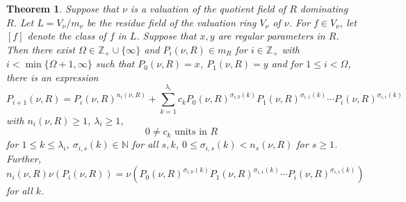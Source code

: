 \documentclass[11pt]{amsart}
\def\NZQ{\mathbb}               %
\def\NN{{\NZQ N}}
\def\ZZ{{\NZQ Z}}
\newtheorem{Theorem}{Theorem}[section]
\begin{document}
\begin{Theorem}\label{Theorem1*} Suppose that  $\nu$ is a  valuation 
of the quotient field of $R$ dominating $R$. Let $L=V_{\nu}/m_{\nu}$ be the residue field of the valuation ring $V_{\nu}$ of $\nu$. For $f \in V_{\nu}$, let $[f]$ denote the class of $f$ in $L$. Suppose that $x,y$ are regular parameters in $R$.
Then  there exist $\Omega\in\ZZ_+\cup\{\infty\}$ and 
$P_i(\nu,R)\in m_R$ for $i\in\ZZ_+$ with $i<\min\{\Omega+1,\infty\}$
 such that $P_0(\nu,R)=x$, $P_1(\nu,R)=y$ and for $1\le i<\Omega$, there is an expression
 \begin{equation}\label{eq11*} 
 P_{i+1}(\nu,R) = P_i(\nu,R)^{n_i(\nu,R)}+\sum_{k=1}^{\lambda_i} c_kP_0(\nu,R)^{\sigma_{i,0}(k)}P_1(\nu,R)^{\sigma_{i,1}(k)}\cdots P_{i}(\nu,R)^{\sigma_{i,i}(k)}
 \end{equation}
 with $n_i(\nu,R)\ge 1$, $\lambda_i\ge 1$, 
 \begin{equation}\label{eq12*}
 0\ne c_k\mbox{ units in }R
 \end{equation}
  for $1\le k\le \lambda_i$,
 $\sigma_{i,s}(k)\in\NN$ for all $s,k$,  $0\le \sigma_{i,s}(k)<n_s(\nu,R)$ for $s\ge 1$.
 Further,
 $$
 n_i(\nu,R)\nu(P_i(\nu,R))=\nu(P_0(\nu,R)^{\sigma_{i,0}(k)}P_1(\nu,R)^{\sigma_{i,1}(k)}\cdots P_{i}(\nu,R)^{\sigma_{i,i}(k)})
 $$
 for all $k$.
 

\end{Theorem}
\end{document}
